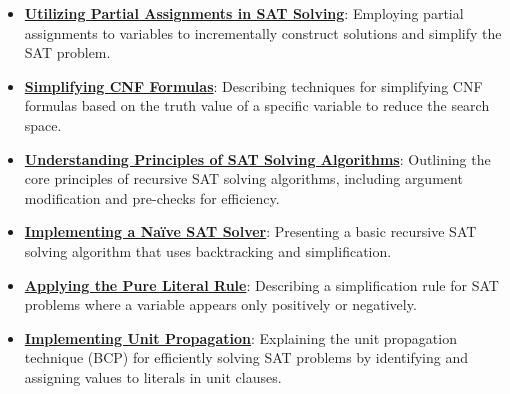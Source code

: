 \documentclass{article}%
\begin{document}
\begin{itemize}[leftmargin=*]
\item \href{https://purdue.brightspace.com/d2l/common/assets/pdfjs-d2l-dist/1.0.14-legacy/web/viewer.html?file=%2Fcontent%2Fenforced%2F1095467-wl.202510.CS.24300.001%2F15L2-SAT.pdf%3Fou%3D1095467&lang=en-us&container=d2l-fileviewer-rendered-pdf&fullscreen=d2l-fileviewer-rendered-pdf-dialog&height=667#page=14}{\textbf{Utilizing Partial Assignments in SAT Solving}}: Employing partial assignments to variables to incrementally construct solutions and simplify the SAT problem.%
\item \href{https://purdue.brightspace.com/d2l/common/assets/pdfjs-d2l-dist/1.0.14-legacy/web/viewer.html?file=%2Fcontent%2Fenforced%2F1095467-wl.202510.CS.24300.001%2F15L2-SAT.pdf%3Fou%3D1095467&lang=en-us&container=d2l-fileviewer-rendered-pdf&fullscreen=d2l-fileviewer-rendered-pdf-dialog&height=667#page=15}{\textbf{Simplifying CNF Formulas}}: Describing techniques for simplifying CNF formulas based on the truth value of a specific variable to reduce the search space.%
\item \href{https://purdue.brightspace.com/d2l/common/assets/pdfjs-d2l-dist/1.0.14-legacy/web/viewer.html?file=%2Fcontent%2Fenforced%2F1095467-wl.202510.CS.24300.001%2F15L2-SAT.pdf%3Fou%3D1095467&lang=en-us&container=d2l-fileviewer-rendered-pdf&fullscreen=d2l-fileviewer-rendered-pdf-dialog&height=667#page=17}{\textbf{Understanding Principles of SAT Solving Algorithms}}: Outlining the core principles of recursive SAT solving algorithms, including argument modification and pre-checks for efficiency.%
\item \href{https://purdue.brightspace.com/d2l/common/assets/pdfjs-d2l-dist/1.0.14-legacy/web/viewer.html?file=%2Fcontent%2Fenforced%2F1095467-wl.202510.CS.24300.001%2F15L2-SAT.pdf%3Fou%3D1095467&lang=en-us&container=d2l-fileviewer-rendered-pdf&fullscreen=d2l-fileviewer-rendered-pdf-dialog&height=667#page=18}{\textbf{Implementing a Naïve SAT Solver}}: Presenting a basic recursive SAT solving algorithm that uses backtracking and simplification.%
\item \href{https://purdue.brightspace.com/d2l/common/assets/pdfjs-d2l-dist/1.0.14-legacy/web/viewer.html?file=%2Fcontent%2Fenforced%2F1095467-wl.202510.CS.24300.001%2F15L2-SAT.pdf%3Fou%3D1095467&lang=en-us&container=d2l-fileviewer-rendered-pdf&fullscreen=d2l-fileviewer-rendered-pdf-dialog&height=667#page=19}{\textbf{Applying the Pure Literal Rule}}: Describing a simplification rule for SAT problems where a variable appears only positively or negatively.%
\item \href{https://purdue.brightspace.com/d2l/common/assets/pdfjs-d2l-dist/1.0.14-legacy/web/viewer.html?file=%2Fcontent%2Fenforced%2F1095467-wl.202510.CS.24300.001%2F15L2-SAT.pdf%3Fou%3D1095467&lang=en-us&container=d2l-fileviewer-rendered-pdf&fullscreen=d2l-fileviewer-rendered-pdf-dialog&height=667#page=20}{\textbf{Implementing Unit Propagation}}: Explaining the unit propagation technique (BCP) for efficiently solving SAT problems by identifying and assigning values to literals in unit clauses.%

\end{itemize}
\end{document}
